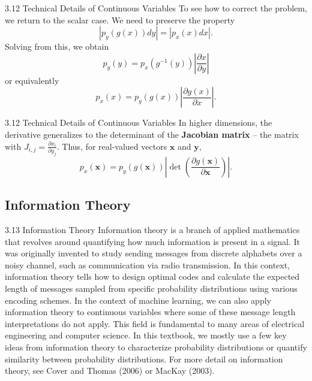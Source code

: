 \begin{frame}{3.12 Technical Details of Continuous Variables}
    \justifying
    To see how to correct the problem, we return to the scalar case. We need to preserve the property
    \begin{equation}
        |p_{y}(g(x))dy| = |p_{x}(x)dx|.
        \label{eq:3_44}
    \end{equation}
    Solving from this, we obtain
    \begin{equation}
        p_{y}(y) = p_{x}(g^{-1}(y))\left|\frac{\partial x}{\partial y}\right|
        \label{eq:3_45}
    \end{equation}
    or equivalently
    \begin{equation}
        p_{x}(x) = p_{y}(g(x))\left|\frac{\partial g(x)}{\partial x}\right|.
        \label{eq:3_46}
    \end{equation}
\end{frame}

\begin{frame}{3.12 Technical Details of Continuous Variables}
    \justifying
    In higher dimensions, the derivative generalizes to the determinant of the \textbf{Jacobian matrix} -- the matrix with $J_{i,j} = \frac{\partial x_{i}}{\partial y_{j}}$. Thus, for real-valued vectors $\boldsymbol{x}$ and $\boldsymbol{y}$,
    \begin{equation}
        p_{x}(\boldsymbol{x}) = p_{y}(g(\boldsymbol{x}))\left|\det{\left(\frac{\partial g(\boldsymbol{x})}{\partial \boldsymbol{x}} \right)}\right|.
        \label{eq:3_47}
    \end{equation}
\end{frame}

\subsection{Information Theory}
\begin{frame}{3.13 Information Theory}
    \justifying
    Information theory is a branch of applied mathematics that revolves around quantifying how much information is present in a signal. It was originally invented to study sending messages from discrete alphabets over a noisy channel, such as communication via radio transmission. In this context, information theory tells how to design optimal codes and calculate the expected length of messages sampled from specific probability distributions using various encoding schemes. In the context of machine learning, we can also apply information theory to continuous variables where some of these message length interpretations do not apply. This field is fundamental to many areas of electrical engineering and computer science. In this textbook, we mostly use a few key ideas from information theory to characterize probability distributions or quantify similarity between probability distributions. For more detail on information theory, see Cover and Thomas (2006) or MacKay (2003).
\end{frame}

